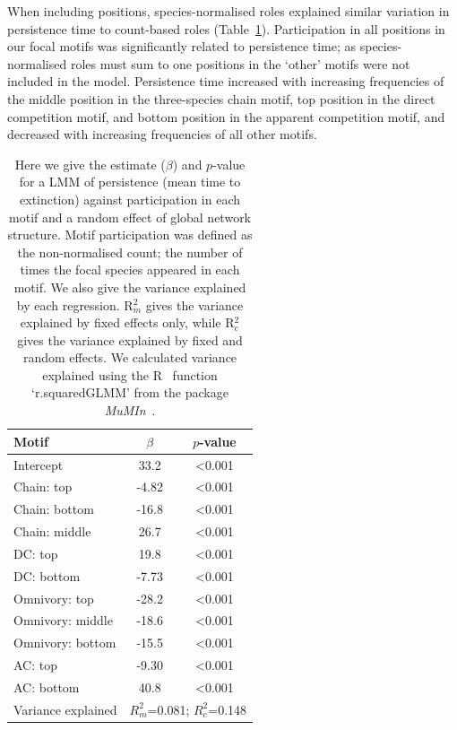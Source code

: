 \documentclass[12pt]{article}
\begin{document}
\begin{spacing}{2.0}
        
        When including positions, species-normalised roles explained similar variation in persistence time to count-based roles (Table~\ref{tab:freq_positions}).
        Participation in all positions in our focal motifs was significantly related to persistence time; as species-normalised roles must sum to one positions in the `other' motifs were not included in the model.
        Persistence time increased with increasing frequencies of the middle position in the three-species chain motif, top position in the direct competition motif, and bottom position in the apparent competition motif, and decreased with increasing frequencies of all other motifs.
        

		\begin{table}[h!]
    		\caption{Here we give the estimate ($\beta$) and $p$-value for a LMM of persistence (mean time to extinction) against participation in each motif and a random effect of global network structure. Motif participation was defined as the non-normalised count; the number of times the focal species appeared in each motif. We also give the variance explained by each regression. R$^{2}_{m}$ gives the variance explained by fixed effects only, while R$^{2}_{c}$ gives the variance explained by fixed and random effects. We calculated variance explained using the R~\citep{R} function `r.squaredGLMM' from the package \emph{MuMIn}~\citep{MuMIn}.}
    		\label{tab:freq_positions}
    		\begin{tabular}{l | c c}
    		Motif & $\beta$ & $p$-value \\  
    		\hline
            Intercept	&	33.2	&	\textless0.001	\\
            Chain: top	&	-4.82	&	\textless0.001	\\
            Chain: bottom	&	-16.8	&	\textless0.001	\\
            Chain: middle	&	26.7	&	\textless0.001	\\
            DC: top	&	19.8	&	\textless0.001	\\
            DC: bottom	&	-7.73	&	\textless0.001	\\
            Omnivory: top	&	-28.2	&	\textless0.001	\\
            Omnivory: middle	&	-18.6	&	\textless0.001	\\
            Omnivory: bottom	&	-15.5	&	\textless0.001	\\
            AC: top	&	-9.30	&	\textless0.001	\\
            AC: bottom	&	40.8	&	\textless0.001	\\
            \hline
    		Variance explained & \multicolumn{2}{c}{$R^{2}_m$=0.081; $R^2_c$=0.148} \\
    		\hline
    		\end{tabular}
    		\end{table}


\end{spacing}
\end{document}
